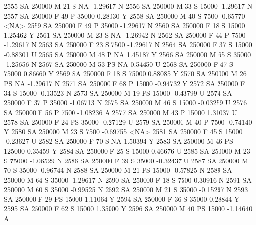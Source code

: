 \documentclass{article}
\begin{document}
\begin{Schunk}
\begin{Soutput}
2555     SA     250000   M  21         S     NA  -1.29617    N
2556     SA     250000   M  33         S  15000  -1.29617    N
2557     SA     250000   F  49         P  35000   0.28030    Y
2558     SA     250000   M  40         S   7500  -0.65770 <NA>
2559     SA     250000   F  49         P  35000  -1.29617    N
2560     SA     250000   F  18         S  15000   1.25462    Y
2561     SA     250000   M  23         S     NA  -1.26942    N
2562     SA     250000   F  44         P   7500  -1.29617    N
2563     SA     250000   F  23         S   7500  -1.29617    N
2564     SA     250000   F  37         S  15000  -0.88301    U
2565     SA     250000   M  48         P     NA   1.45187    Y
2566     SA     250000   M  65         S  35000  -1.25656    N
2567     SA     250000   M  53        PS     NA   0.54450    U
2568     SA     250000   F  47         S  75000   0.86660    Y
2569     SA     250000   F  18         S  75000   0.88085    Y
2570     SA     250000   M  26        PS     NA  -1.29617    N
2571     SA     250000   F  68         P  15000  -0.94732    Y
2572     SA     250000   F  34         S  15000  -0.13523    N
2573     SA     250000   M  19        PS  15000  -0.43799    U
2574     SA     250000   F  37         P  35000  -1.06713    N
2575     SA     250000   M  46         S  15000  -0.03259    U
2576     SA     250000   F  56         P   7500  -1.08236    A
2577     SA     250000   M  43         P  15000   1.31037    U
2578     SA     250000   F  24        PS  35000  -0.27129    U
2579     SA     250000   M  40         P   7500  -0.74140    Y
2580     SA     250000   M  23         S   7500  -0.69755 <NA>
2581     SA     250000   F  45         S  15000  -0.23627    U
2582     SA     250000   F  70         S     NA   1.50394    Y
2583     SA     250000   M  46        PS 125000   0.35459    Y
2584     SA     250000   F  25         S  15000   0.46676    U
2585     SA     250000   M  23         S  75000  -1.06529    N
2586     SA     250000   F  39         S  35000  -0.32437    U
2587     SA     250000   M  70         S  35000  -0.96744    N
2588     SA     250000   M  21        PS  15000  -0.57825    N
2589     SA     250000   M  64         S  35000  -1.29617    N
2590     SA     250000   F  18         S   7500   0.30916    N
2591     SA     250000   M  60         S  35000  -0.99525    N
2592     SA     250000   M  21         S  35000  -0.15297    N
2593     SA     250000   F  29        PS  15000   1.11064    Y
2594     SA     250000   F  36         S  35000   0.28844    Y
2595     SA     250000   F  62         S  15000   1.35000    Y
2596     SA     250000   M  40        PS  15000  -1.14640    A

\end{Soutput}
\end{Schunk}
\end{document}

